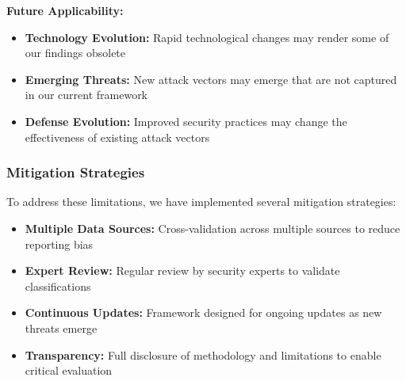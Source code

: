 \textbf{Future Applicability:}
\begin{itemize}
    \item \textbf{Technology Evolution:} Rapid technological changes may render some of our findings obsolete
    \item \textbf{Emerging Threats:} New attack vectors may emerge that are not captured in our current framework
    \item \textbf{Defense Evolution:} Improved security practices may change the effectiveness of existing attack vectors
\end{itemize}

\subsubsection{Mitigation Strategies}
To address these limitations, we have implemented several mitigation strategies:
\begin{itemize}
    \item \textbf{Multiple Data Sources:} Cross-validation across multiple sources to reduce reporting bias
    \item \textbf{Expert Review:} Regular review by security experts to validate classifications
    \item \textbf{Continuous Updates:} Framework designed for ongoing updates as new threats emerge
    \item \textbf{Transparency:} Full disclosure of methodology and limitations to enable critical evaluation
\end{itemize}


